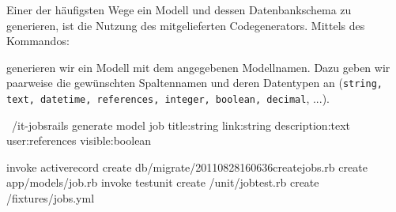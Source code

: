 Einer der häufigsten Wege ein Modell und dessen Datenbankschema zu generieren, ist die Nutzung des mitgelieferten Codegenerators. Mittels des Kommandos:


generieren wir ein Modell mit dem angegebenen Modellnamen. Dazu geben wir paarweise die gewünschten Spaltennamen und deren Datentypen an (\texttt{string, text, datetime, references, integer, boolean, decimal}, ...).
%                                                                                                                                                      
%                                                                                                                                                      
\begin{ruby}[label=Shell]
~/it-jobsrails generate model job title:string link:string 
    description:text user:references visible:boolean

      invoke  active\PYZus{}record
      create    db/migrate/20110828160636\PYZus{}create\PYZus{}jobs.rb
      create    app/models/job.rb
      invoke    test\PYZus{}unit
      create      /unit/job\PYZus{}test.rb
      create      /fixtures/jobs.yml
\end{ruby}

